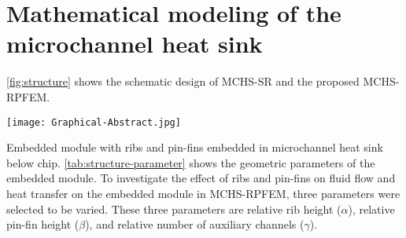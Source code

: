 %
% 
%

\section{Mathematical modeling of the microchannel heat sink}

\cref{fig:structure} shows the schematic design of MCHS-SR and the proposed MCHS-RPFEM.


\begin{figure*}[htbp] %
    \centering %
    \scriptsize %
    \texttt{[image: Graphical-Abstract.jpg]} %
    \caption{
        (a) Straight rectangular microchannel (MCHS-SR),
        (b) microchannel heat sink with embedded modules with ribs and pin-fins (MCHS-RPFEM),
        (c) schematic diagram of the structure of MCHS-RPFEM.}
    \label{fig:structure}
\end{figure*}
Embedded module with ribs and pin-fins embedded in microchannel heat sink below chip.
\cref{tab:structure-parameter} shows the geometric parameters of the embedded module.
To investigate the effect of ribs and pin-fins on fluid flow and heat transfer on the embedded module in MCHS-RPFEM, three parameters were selected to be varied.
These three parameters are relative rib height ($\alpha$), relative pin-fin height ($\beta$), and relative number of auxiliary channels ($\gamma$).

